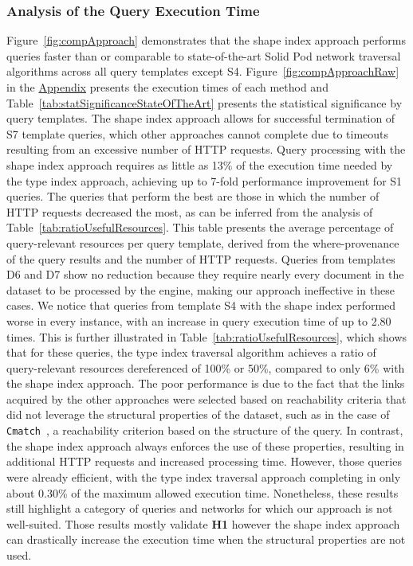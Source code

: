 \subsubsection{Analysis of the Query Execution Time}
Figure~\ref{fig:compApproach} demonstrates that the shape index approach performs queries faster than or comparable to state-of-the-art Solid Pod network traversal algorithms across all query templates except S4.
Figure~\ref{fig:compApproachRaw} in the \hyperref[sec:appendix]{Appendix} presents the execution times of each method and Table~\ref{tab:statSignificanceStateOfTheArt} presents the statistical significance by query templates.
The shape index approach allows for successful termination of S7 template queries, which other approaches cannot complete due to timeouts resulting from an excessive number of HTTP requests.
Query processing with the shape index approach requires as little as 13\% of the execution time needed by the type index approach, achieving up to 7-fold performance improvement for S1 queries.
The queries that perform the best are those in which the number of HTTP requests decreased the most, as can be inferred from the analysis of Table~\ref{tab:ratioUsefulResources}.
This table presents the average percentage of query-relevant resources per query template, derived from the where-provenance~\cite{buneman2001and} of the query results and the number of HTTP requests. 
Queries from templates D6 and D7 show no reduction because they require nearly every document in the dataset to be processed by the engine, making our approach ineffective in these cases.
We notice that queries from template S4 with the shape index performed worse in every instance, with an increase in query execution time of up to 2.80 times.
This is further illustrated in Table~\ref{tab:ratioUsefulResources}, which shows that for these queries, the type index traversal algorithm achieves a ratio of query-relevant resources dereferenced of 100\% or 50\%, compared to only 6\% with the shape index approach.
The poor performance is due to the fact that the links acquired by the other approaches were selected based on reachability criteria that did not leverage the structural properties of the dataset, such as in the case of \texttt{Cmatch}~\cite{hartig2016walking}, a reachability criterion based on the structure of the query.
In contrast, the shape index approach always enforces the use of these properties, resulting in additional HTTP requests and increased processing time.
However, those queries were already efficient, with the type index traversal approach completing in only about 0.30\% of the maximum allowed execution time.
Nonetheless, these results still highlight a category of queries and networks for which our approach is not well-suited.
Those results mostly validate \textbf{H1} however the shape index approach can drastically increase the execution time when the structural properties are not used.

